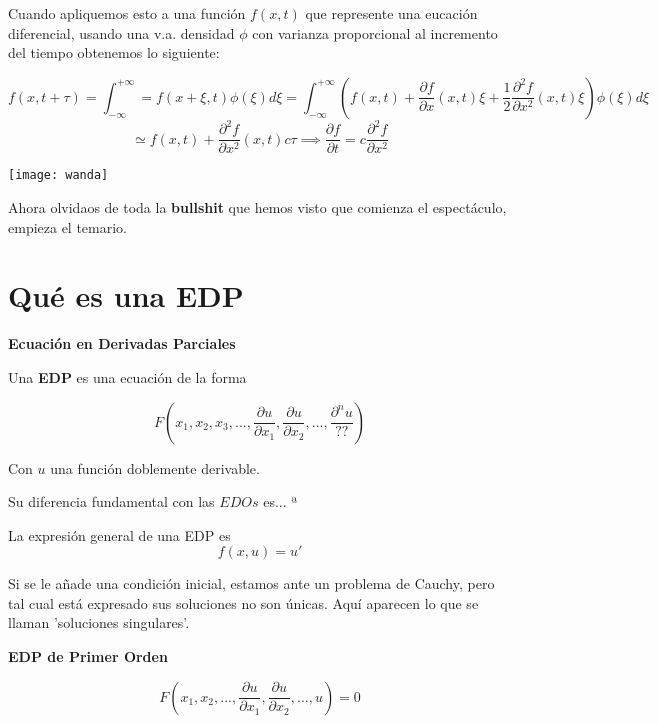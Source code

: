 \documentclass[openany]{book}
\begin{document}

Cuando apliquemos esto a una función $ f(x,t) $ que represente una eucación diferencial, usando una v.a. densidad $\phi$ con varianza proporcional al incremento del tiempo obtenemos lo siguiente:

$$ f(x,t+\tau) = \int_{-\infty}^{+\infty} = f(x+\xi,t)\phi(\xi)d\xi = \int_{-\infty}^{+\infty}\left(f(x,t)+ \dfrac{\partial f}{\partial x}(x,t)\xi + \dfrac{1}{2} \dfrac{\partial ^2 f}{\partial x ^2} (x,t) \xi\right) \phi(\xi) d\xi $$
$$\simeq f(x,t)+ \dfrac{\partial ^2 f}{\partial x ^2}(x,t)c\tau \implies \dfrac{\partial f}{\partial t} = c \dfrac{\partial ^2f }{\partial x ^2} $$

\begin{minipage}[l]{0.1\textwidth}
    \texttt{[image: wanda]}
\end{minipage}
\begin{minipage}[l]{0.8\textwidth}
  Ahora olvidaos de toda la \textbf{bullshit} que hemos visto que comienza el espectáculo, empieza el temario.
\end{minipage}

\section{Qué es una EDP}

\begin{definition}
  { \color{turquoise} \textbf{Ecuación en Derivadas Parciales}}

  Una \textbf{EDP} es una ecuación de la forma

  $$ F\left(x_1, x_2, x_3,..., \dfrac{ \partial u}{\partial x_1},\dfrac{ \partial u}{\partial x_2}, ..., \dfrac{ \partial^n u}{??} \right) $$

  Con $ u $ una función doblemente derivable.
\end{definition}

Su diferencia fundamental con las $ EDOs $ es... ª

La expresión general de una EDP es $$ f(x,u)=u' $$

Si se le añade una condición inicial, estamos ante un problema de Cauchy, pero tal cual está expresado sus soluciones no son únicas. Aquí aparecen lo que se llaman 'soluciones singulares'.

\begin{definition}
  { \color{turquoise} \textbf{EDP de Primer Orden}}

  $$ F \left( x_1, x_2, ... , \dfrac{\partial u}{\partial x_1},\dfrac{\partial u}{\partial x_2},...,u  \right)=0 $$
\end{definition}
\end{document}
